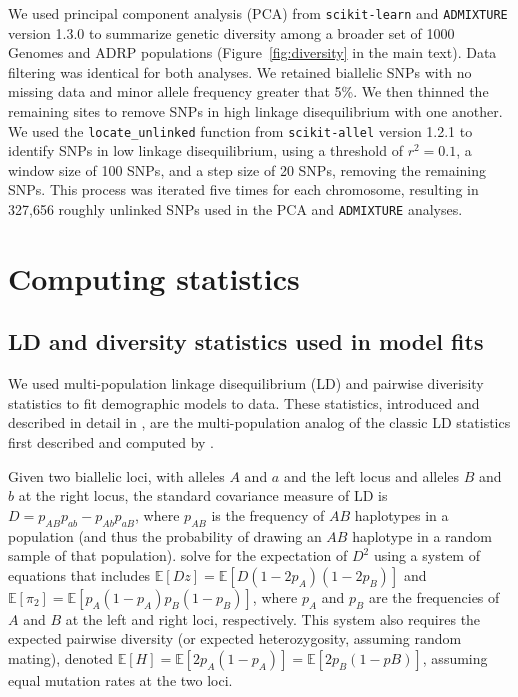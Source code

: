 \documentclass[]{article}
\newcommand{\E}{\mathbb{E}}
\begin{document}
We used principal component analysis (PCA) from \texttt{scikit-learn}
\citep{Pedregosa2011-ke} and \texttt{ADMIXTURE} version 1.3.0
\citep{Alexander2011-aq} to summarize genetic diversity among a broader set of
1000 Genomes and ADRP populations (Figure~\ref{fig:diversity} in the main text). Data
filtering was identical for both analyses. We retained biallelic SNPs with no
missing data and minor allele frequency greater that 5\%. We then thinned the
remaining sites to remove SNPs in high linkage disequilibrium with one another.
We used the \texttt{locate\_unlinked} function from \texttt{scikit-allel}
version 1.2.1 \citep{Miles2021-yq} to identify SNPs in low linkage
disequilibrium, using a threshold of $r^2=0.1$, a window size of 100 SNPs, and
a step size of 20 SNPs, removing the remaining SNPs. This process was iterated
five times for each chromosome, resulting in 327,656 roughly unlinked SNPs used
in the PCA and \texttt{ADMIXTURE} analyses.

\section{Computing statistics}

\subsection{LD and diversity statistics used in model fits}
\label{sec:supp-ld-stats}

We used multi-population linkage disequilibrium (LD) and pairwise diverisity
statistics to fit demographic models to data. These statistics, introduced and
described in detail in \citet{Ragsdale2019-nt}, are the multi-population analog
of the classic LD statistics first described and computed by
\citet{Hill1968-vu,Ohta1971-yd}.

Given two biallelic loci, with alleles $A$ and $a$ and the left locus and
alleles $B$ and $b$ at the right locus, the standard covariance measure of LD is
$D=p_{AB}p_{ab}-p_{Ab}p_{aB}$, where $p_{AB}$ is the frequency of $AB$
haplotypes in a population (and thus the probability of drawing an $AB$
haplotype in a random sample of that population). \citet{Hill1968-vu} solve for
the expectation of $D^2$ using a system of equations that includes $\E[Dz] =
\E[D(1-2p_A)(1-2p_B)]$ and $\E[\pi_2] = \E[p_A(1-p_A)p_B(1-p_B)]$, where $p_A$
and $p_B$ are the frequencies of $A$ and $B$ at the left and right loci,
respectively. This system also requires the expected pairwise diversity (or
expected heterozygosity, assuming random mating), denoted $\E[H] =
\E[2p_A(1-p_A)] = \E[2p_B(1-pB)]$, assuming equal mutation rates at the two
loci.
\end{document}
